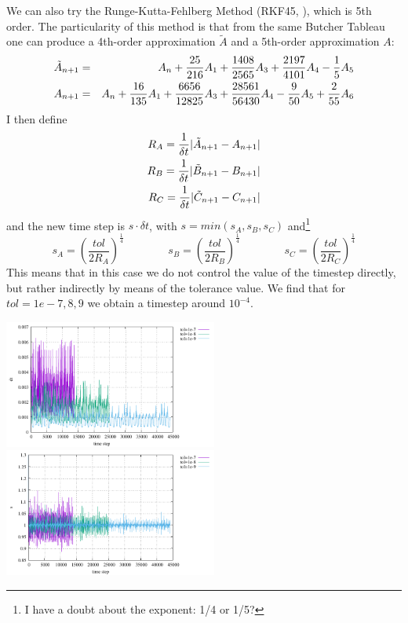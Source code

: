 We can also try the Runge-Kutta-Fehlberg Method (RKF45, \cite{dopr80}), which is 
5th order. 
The particularity of this method is that from the same Butcher Tableau one 
can produce a 4th-order approximation $\tilde{A}$ and a 5th-order approximation $A$:
\begin{eqnarray}
\tilde{A}_{n+1}&=&A_n + \frac{25}{216}A_1 + \frac{1408}{2565}A_3+\frac{2197}{4101}A_4 -\frac15 A_5 \nonumber\\
A_{n+1}&=&A_n + \frac{16}{135}A_1 + \frac{6656}{12825}A_3+\frac{28561}{56430}A_4 \nonumber
-\frac{9}{50} A_5 + \frac{2}{55} A_6
\end{eqnarray}
I then define 
\begin{eqnarray}
R_A=\frac{1}{\delta t} | \tilde{A}_{n+1} - A_{n+1} | \nonumber\\
R_B=\frac{1}{\delta t} | \tilde{B}_{n+1} - B_{n+1} | \nonumber\\
R_C=\frac{1}{\delta t} | \tilde{C}_{n+1} - C_{n+1} | \nonumber
\end{eqnarray}
and the new time step is $s\cdot \delta t$, with $s=min(s_A,s_B,s_C)$
and\footnote{I have a doubt about the exponent: 1/4 or 1/5?} 
\[
s_A= \left(\frac{tol}{2R_A}\right)^\frac14 \qquad \qquad 
s_B= \left(\frac{tol}{2R_B}\right)^\frac14 \qquad \qquad 
s_C= \left(\frac{tol}{2R_C}\right)^\frac14
\]
This means that in this case we do not control the value of the timestep
directly, but rather indirectly by means of the tolerance value.
We find that for $tol=1e-7,8,9$ we obtain a timestep around $10^{-4}$.
\begin{center}
\includegraphics[width=7cm]{python_codes/fieldstone_156/results/scheme6/dt.pdf}
\includegraphics[width=7cm]{python_codes/fieldstone_156/results/scheme6/sABC.pdf}
\end{center}
